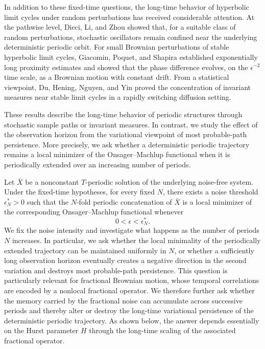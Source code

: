 \documentclass[preprint,12pt]{elsarticle}
\theoremstyle{definition}
\theoremstyle{plain}
\begin{document}
In addition to these fixed-time questions, the long-time behavior of
hyperbolic limit cycles under random perturbations has received
considerable attention. At the pathwise level, Dieci, Li, and Zhou
\cite{Dieci2016RandomPerturbations} showed that, for a suitable class
of random perturbations, stochastic oscillators remain confined near
the underlying deterministic periodic orbit. For small Brownian
perturbations of stable hyperbolic limit cycles, Giacomin, Poquet, and
Shapira \cite{Giacomin2018PhaseDiffusion} established exponentially
long proximity estimates and showed that the phase difference evolves,
on the $\epsilon^{-2}$ time scale, as a Brownian motion with constant
drift. From a statistical viewpoint, Du, Hening, Nguyen, and Yin
\cite{Du2021SwitchingDiffusions} proved the concentration of invariant
measures near stable limit cycles in a rapidly switching diffusion
setting.

These results describe the long-time behavior of periodic structures
through stochastic sample paths or invariant measures. In contrast, we
study the effect of the observation horizon from the variational
viewpoint of most probable-path persistence. More precisely, we ask
whether a deterministic periodic trajectory remains a local minimizer
of the Onsager--Machlup functional when it is periodically extended
over an increasing number of periods.

Let $\bar X$ be a nonconstant $T$-periodic solution of the underlying
noise-free system. Under the fixed-time hypotheses, for every fixed
$N$, there exists a noise threshold $\epsilon_N^\ast>0$ such that the
$N$-fold periodic concatenation of $\bar X$ is a local minimizer of the
corresponding Onsager--Machlup functional whenever
\begin{equation*}
    0<\epsilon<\epsilon_N^\ast.
\end{equation*}
We fix the noise intensity and investigate what happens as the number
of periods $N$ increases. In particular, we ask whether the local
minimality of the periodically extended trajectory can be maintained
uniformly in $N$, or whether a sufficiently long observation horizon
eventually creates a negative direction in the second variation and
destroys most probable-path persistence.
This question is particularly relevant for fractional Brownian motion,
whose temporal correlations are encoded by a nonlocal fractional operator. We therefore further ask whether the memory
carried by the fractional noise can accumulate across successive
periods and thereby alter or destroy the long-time variational
persistence of the deterministic periodic trajectory. As shown below,
the answer depends essentially on the Hurst parameter $H$ through the
long-time scaling of the associated fractional operator.
\end{document}
